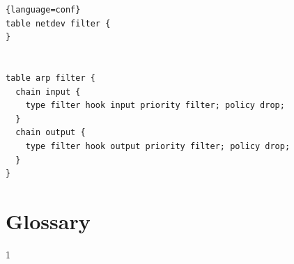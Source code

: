 \documentclass[mscthesis]{usiinfthesis}
\begin{document}
\begin{lstlisting}{language=conf}
table netdev filter {
}


table arp filter {
  chain input {
    type filter hook input priority filter; policy drop;
  }
  chain output {
    type filter hook output priority filter; policy drop;
  }
}
\end{lstlisting}

\backmatter

\chapter{Glossary} %

%
%



1
\end{document}
